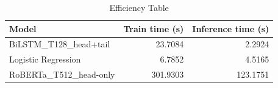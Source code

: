 \begin{table}
\caption{Efficiency Table}
\label{tab:efficiency_table}
\begin{tabular}{lrr}
\toprule
Model & Train time (s) & Inference time (s) \\
\midrule
BiLSTM_T128_head+tail & 23.7084 & 2.2924 \\
Logistic Regression & 6.7852 & 4.5165 \\
RoBERTa_T512_head-only & 301.9303 & 123.1751 \\
\bottomrule
\end{tabular}
\end{table}
